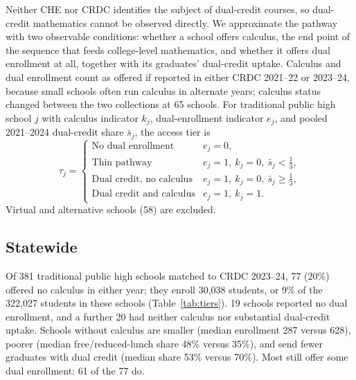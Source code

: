 \documentclass[aps,prd,reprint,superscriptaddress,nofootinbib,floatfix]{revtex4-2}
\begin{document}
Neither CHE nor CRDC identifies the subject of dual-credit courses, so dual-credit mathematics cannot be observed directly. We approximate the pathway with two observable conditions: whether a school offers calculus, the end point of the sequence that feeds college-level mathematics, and whether it offers dual enrollment at all, together with its graduates' dual-credit uptake. Calculus and dual enrollment count as offered if reported in either CRDC 2021--22 or 2023--24, because small schools often run calculus in alternate years; calculus status changed between the two collections at 65 schools. For traditional public high school $j$ with calculus indicator $k_j$, dual-enrollment indicator $e_j$, and pooled 2021--2024 dual-credit share $\bar s_j$, the access tier is
\begin{equation}
\tau_j=\begin{cases}
\text{No dual enrollment} & e_j=0,\\
\text{Thin pathway} & e_j=1,\ k_j=0,\ \bar s_j<\tfrac13,\\
\text{Dual credit, no calculus} & e_j=1,\ k_j=0,\ \bar s_j\geq\tfrac13,\\
\text{Dual credit and calculus} & e_j=1,\ k_j=1.
\end{cases}\label{eq:tier}
\end{equation}
Virtual and alternative schools (58) are excluded.

\subsection{Statewide}

Of 381 traditional public high schools matched to CRDC 2023--24, 77 (20\%) offered no calculus in either year; they enroll 30,038 students, or 9\% of the 322,027 students in these schools (Table~\ref{tab:tiers}). 19 schools reported no dual enrollment, and a further 20 had neither calculus nor substantial dual-credit uptake. Schools without calculus are smaller (median enrollment 287 versus 628), poorer (median free/reduced-lunch share 48\% versus 35\%), and send fewer graduates with dual credit (median share 53\% versus 70\%). Most still offer some dual enrollment: 61 of the 77 do.
\end{document}
